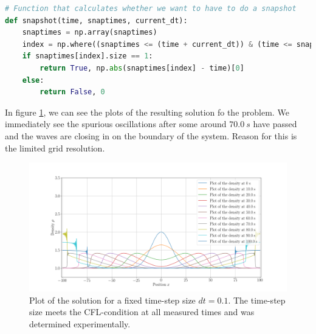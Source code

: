\documentclass{scrartcl}
\begin{document}
\begin{lstlisting}[title=Function to check whether we have to do a snapshot or not.,  language=Python, frame=single]
# Function that calculates whether we want to have to do a snapshot
def snapshot(time, snaptimes, current_dt):
	snaptimes = np.array(snaptimes)
	index = np.where((snaptimes <= (time + current_dt)) & (time <= snaptimes))[0]
	if snaptimes[index].size == 1:
		return True, np.abs(snaptimes[index] - time)[0]
	else:
		return False, 0

\end{lstlisting}
In figure \ref{fig:ex1fixed}, we can see the plots of the resulting solution fo the problem. 
We immediately see the spurious oscillations after some around \( \SI{70.0}{s} \) have passed and the waves are closing in on the boundary of the system. 
Reason for this is the limited grid resolution.
\begin{figure}[H]
	\centering
	\includegraphics[width=1\linewidth]{Plots/Ex1_fixed}
	\caption{Plot of the solution for a fixed time-step size \( dt = 0.1 \). The time-step size meets the CFL-condition at all measured times and was determined experimentally.}
	\label{fig:ex1fixed}
\end{figure}
\end{document}
